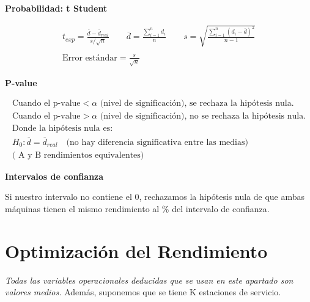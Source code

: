 \documentclass[a4paper,12pt]{article}
\begin{document}
    \textbf{Probabilidad: t Student}

    \begin{tcolorbox}[colback=yellow!5!white, colframe=yellow!75!black]
    \begin{align*}
        t_{exp} = \frac{\overline{d}-\overline{d}_{real}}{s/\sqrt{n}} \quad \quad \overline{d} = \frac{\sum_{i=1}^{n}d_i}{n} \quad \quad s = \sqrt{\frac{\sum_{i=1}^{n}(d_i-\overline{d})^2}{n-1}} \\
        \\
        \text{Error estándar} = \frac{s}{\sqrt{n}} 
    \end{align*}
    \end{tcolorbox}

    \textbf{P-value}

    \begin{tcolorbox}[colback=yellow!5!white, colframe=yellow!75!black]
    \begin{align*}
        \text{Cuando el p-value} < \alpha \text{ (nivel de significación), se rechaza la hipótesis nula.} \\
        \text{Cuando el p-value} > \alpha \text{ (nivel de significación), no se rechaza la hipótesis nula.} \\
        \text{Donde la hipótesis nula es: } \\
        H_0: \overline{d} = \overline{d}_{real} \quad \text{(no hay diferencia significativa entre las medias)} \\
        \text{( A y B rendimientos equivalentes)}
    \end{align*}
    \end{tcolorbox}

    \textbf{Intervalos de confianza}

    \begin{tcolorbox}[colback=yellow!5!white, colframe=yellow!75!black]
    Si nuestro intervalo no contiene el 0, rechazamos la hipótesis nula de que ambas máquinas tienen el mismo rendimiento al \% del intervalo de confianza.
    \end{tcolorbox}
    

    


\section*{Optimización del Rendimiento}

\textit{Todas las variables operacionales deducidas que se usan en este apartado son valores medios.} Además, suponemos que se tiene K estaciones de servicio.
\end{document}
